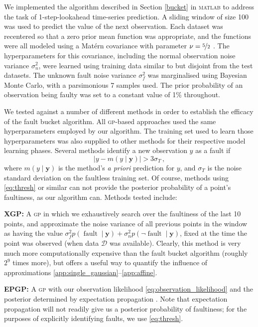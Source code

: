 \documentclass[twoside]{article}
\newcommand{\given}{\!\ensuremath{\mid}\!}
\newcommand{\cm}[1]{\ensuremath{\mathcal{#1}}}
\newcommand{\bm}[1]{\ensuremath{\mathbf{#1}}}
\newcommand{\data}{\ensuremath{\cm{D}}}
\newcommand{\acro}[1]{\textsc{\MakeLowercase{#1}}}
\newcommand{\vect}[1]{\bm{#1}}
\newcommand{\vy}{\vect{y}}
\newcommand{\p}[2]{p(#1\given#2)}
\newcommand{\mean}[2]{{m}(#1\given#2)}
\DeclareMathOperator{\fault}{fault}
\begin{document}
We implemented the algorithm described in Section \ref{bucket} in
\textsc{matlab} to address the task of 1-step-lookahead time-series
prediction.  A sliding window of size 100 was used to predict the
value of the next observation.  Each dataset was recentered so that a
zero prior mean function was appropriate, and the functions were all
modeled using a Mat\'{e}rn covariance with parameter $\nu =
\nicefrac{5}{2}$ \citep{gpml}.  The hyperparameters for this
covariance, including the normal observation noise variance
$\sigma_n^2$, were learned using training data similar to but disjoint from the test datasets.  The unknown fault noise variance $\sigma_f^2$
was marginalised using Bayesian Monte Carlo, with a parsimonious 7 samples used.  The prior probability of an observation being faulty was
set to a constant value of 1\% throughout.

We tested against a number of different methods in order to establish the efficacy of the fault bucket algorithm. All \acro{gp}-based approaches used the same hyperparameters employed by our algorithm. The training set used to learn those hyperparameters was also supplied to other methods for their respective model learning phases. Several methods identify a new observation $y$ as a fault if
\begin{equation}\label{eq:thresh}
 \bigl\lvert y-\mean{y}{\vy} \bigr\rvert > 3\sigma_T\,,
\end{equation}
where $\mean{y}{\vy}$ is the method's \emph{a priori} prediction for $y$, and $\sigma_T$ is the noise standard deviation on the faultless training set. Of course, methods using \eqref{eq:thresh} or similar can not provide the posterior probability of a point's faultiness, as our algorithm can. Methods tested include:

{\bf XGP:}
A  \acro{gp} in which we exhaustively search over the faultiness of the last 10 points, and approximate the noise variance of all previous points in the window as having the value $\sigma_f^2 \p{\fault}{\vy} + \sigma_n^2 \p{\neg\fault}{\vy}$, fixed at the time the point was observed (when data $\data$ was available). Clearly, this method is very much more computationally expensive than the fault bucket algorithm (roughly $2^9$ times more), but offers a useful way to quantify the influence of approximations \ref{app:single_gaussian}--\ref{app:affine}.

{\bf EPGP:}
A \acro{gp} with our observation likelihood \eqref{eq:observation_likelihood} and the posterior determined by expectation propagation \citep{minka2001expectation}. Note that expectation propagation will not readily give us a posterior probability of faultiness; for the purposes of explicitly identifying faults, we use \eqref{eq:thresh}.
\end{document}
